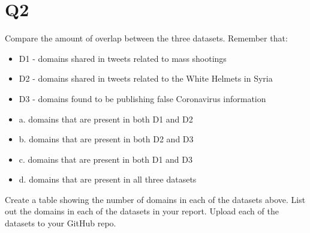 \documentclass[12pt]{article}
\begin{document}
\section*{Q2}
Compare the amount of overlap between the three datasets. Remember that:
\begin{itemize}
        \item D1 - domains shared in tweets related to mass shootings
        \item D2 - domains shared in tweets related to the White Helmets in Syria
        \item D3 - domains found to be publishing false Coronavirus information
\end{itemize}
\begin{itemize}
        \item a. domains that are present in both D1 and D2
        \item b. domains that are present in both D2 and D3
        \item c. domains that are present in both D1 and D3
        \item d. domains that are present in all three datasets
\end{itemize}
Create a table showing the number of domains in each of the datasets above. List out the domains in each of the datasets in your report. Upload each of the datasets to your GitHub repo.
\end{document}
